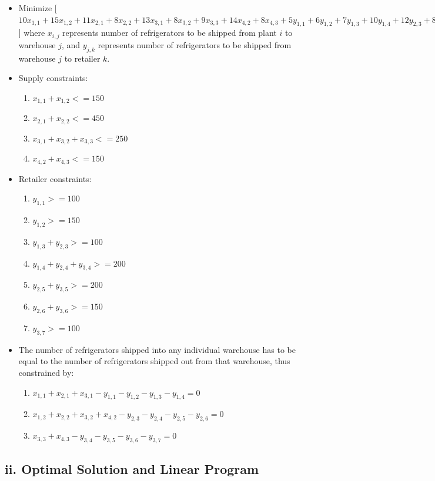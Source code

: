 \documentclass[11pt]{scrreprt}
\begin{document}
\begin{itemize}
	\item Minimize
[$10x_{1,1}+15x_{1,2}+11x_{2,1}+8x_{2,2}+13x_{3,1}+8x_{3,2}+9x_{3,3}+14x_{4,2}+8x_{4,3}+5y_{1,1}+6y_{1,2}+7y_{1,3}+10y_{1,4}+12y_{2,3}+8y_{2,4}+10y_{2,5}+14y_{2,6}+14y_{3,4}+12y_{3,5}+12y_{3,6}+6y_{3,7}$] 
where $x_{i,j}$ represents number of refrigerators to be shipped 
from plant $i$ to warehouse $j$, and $y_{j,k}$ represents number of 
refrigerators to be shipped  from warehouse $j$ to retailer $k$.
	\item Supply constraints:
	\begin{enumerate}
		\item $x_{1,1} + x_{1,2} <= 150$
		\item $x_{2,1} + x_{2,2} <= 450$
		\item $x_{3,1} + x_{3,2} + x_{3,3} <= 250$
		\item $x_{4,2} + x_{4,3} <= 150$
	\end{enumerate}
	\item Retailer constraints:
	\begin{enumerate}
		\item $y_{1,1} >= 100$
		\item $y_{1,2} >= 150$
		\item $y_{1,3} + y_{2,3} >= 100$
		\item $y_{1,4} + y_{2,4} + y_{3,4} >= 200$
		\item $y_{2,5} + y_{3,5} >= 200$
		\item $y_{2,6} + y_{3,6} >= 150$
		\item $y_{3,7} >= 100$
	\end{enumerate}
	\item The number of refrigerators shipped into any individual 
		warehouse has to be equal to the number of refrigerators 
		shipped out from that warehouse, thus constrained by:
	\begin{enumerate}
		\item $x_{1,1} + x_{2,1} + x_{3,1} - y_{1,1} - y_{1,2} - y_{1,3} - y_{1,4} = 0$
		\item $x_{1,2} + x_{2,2} + x_{3,2} + x_{4,2} - y_{2,3} - y_{2,4} - y_{2,5} - y_{2,6} = 0$
		\item $x_{3,3} + x_{4,3} - y_{3,4} - y_{3,5} - y_{3,6} - y_{3,7} = 0$
	\end{enumerate}
\end{itemize}

\subsection{ii. Optimal Solution and Linear Program}
\end{document}
